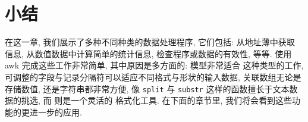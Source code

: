 \section{小结}
\label{sec:data_processing_summary}

在这一章, 我们展示了多种不同种类的数据处理程序, 它们包括: 从地址薄中获取
信息, 从数值数据中计算简单的统计信息, 检查程序或数据的有效性, 等等.
使用 awk 完成这些工作非常简单, 其中原因是多方面的: \patact 模型非常适合
这种类型的工作, 可调整的字段与记录分隔符可以适应不同格式与形状的输入数据,
关联数组无论是存储数值, 还是字符串都非常方便, 像 \verb'split' 与 
\verb'substr' 这样的函数擅长于文本数据的挑选, 而 \printf 则是一个灵活的
格式化工具. 在下面的章节里, 我们将会看到这些功能的更进一步的应用.
